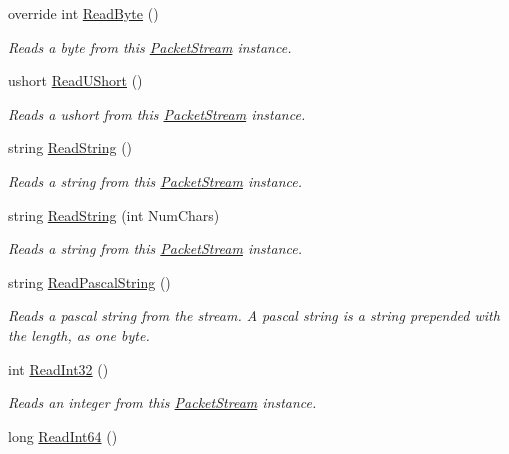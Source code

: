 \begin{DoxyCompactItemize}
override int \hyperlink{class_gonzo_net_1_1_packet_stream_aa177ce15a5dc72bd0b0fef1e1e172ae9}{Read\+Byte} ()
\begin{DoxyCompactList}\small\item\em Reads a byte from this \hyperlink{class_gonzo_net_1_1_packet_stream}{Packet\+Stream} instance. \end{DoxyCompactList}\item 
ushort \hyperlink{class_gonzo_net_1_1_packet_stream_a833a2833da4c5bdcfb9c3b0dc24558ef}{Read\+U\+Short} ()
\begin{DoxyCompactList}\small\item\em Reads a ushort from this \hyperlink{class_gonzo_net_1_1_packet_stream}{Packet\+Stream} instance. \end{DoxyCompactList}\item 
string \hyperlink{class_gonzo_net_1_1_packet_stream_a84e92c178dfde923734850fb228a6905}{Read\+String} ()
\begin{DoxyCompactList}\small\item\em Reads a string from this \hyperlink{class_gonzo_net_1_1_packet_stream}{Packet\+Stream} instance. \end{DoxyCompactList}\item 
string \hyperlink{class_gonzo_net_1_1_packet_stream_a1ba25e40040fc376b13006fb461ea593}{Read\+String} (int Num\+Chars)
\begin{DoxyCompactList}\small\item\em Reads a string from this \hyperlink{class_gonzo_net_1_1_packet_stream}{Packet\+Stream} instance. \end{DoxyCompactList}\item 
string \hyperlink{class_gonzo_net_1_1_packet_stream_add539c3eac3abd48b3b962ae267e07f7}{Read\+Pascal\+String} ()
\begin{DoxyCompactList}\small\item\em Reads a pascal string from the stream. A pascal string is a string prepended with the length, as one byte. \end{DoxyCompactList}\item 
int \hyperlink{class_gonzo_net_1_1_packet_stream_ad45d508a0d4252c4f3757df9b506ed83}{Read\+Int32} ()
\begin{DoxyCompactList}\small\item\em Reads an integer from this \hyperlink{class_gonzo_net_1_1_packet_stream}{Packet\+Stream} instance. \end{DoxyCompactList}\item 
long \hyperlink{class_gonzo_net_1_1_packet_stream_a07e01175b27d020db95d96e416cb569e}{Read\+Int64} ()

\end{DoxyCompactItemize}
